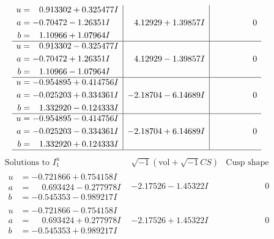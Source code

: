 \documentclass[1p]{elsarticle_modified}
\theoremstyle{definition}
\newcommand{\I}{\sqrt{-1}}
\begin{document}
$$\begin{array}{c|c|c}
\begin{aligned}
u &= \phantom{-}0.913302 + 0.325477 I \\
a &= -0.70472 - 1.26351 I \\
b &= \phantom{-}1.10966 + 1.07964 I\end{aligned}
 & \phantom{-}4.12929 + 1.39857 I & \phantom{-0.000000 } 0 \\ \hline\begin{aligned}
u &= \phantom{-}0.913302 - 0.325477 I \\
a &= -0.70472 + 1.26351 I \\
b &= \phantom{-}1.10966 - 1.07964 I\end{aligned}
 & \phantom{-}4.12929 - 1.39857 I & \phantom{-0.000000 } 0 \\ \hline\begin{aligned}
u &= -0.954895 + 0.414756 I \\
a &= -0.025203 + 0.334361 I \\
b &= \phantom{-}1.332920 - 0.124333 I\end{aligned}
 & -2.18704 - 6.14689 I & \phantom{-0.000000 } 0 \\ \hline\begin{aligned}
u &= -0.954895 - 0.414756 I \\
a &= -0.025203 - 0.334361 I \\
b &= \phantom{-}1.332920 + 0.124333 I\end{aligned}
 & -2.18704 + 6.14689 I & \phantom{-0.000000 } 0\\
 \hline 
 \end{array}$$\newpage$$\begin{array}{c|c|c}  
\text{Solutions to }I^u_{1}& \I (\text{vol} + \sqrt{-1}CS) & \text{Cusp shape}\\
 \hline 
\begin{aligned}
u &= -0.721866 + 0.754158 I \\
a &= \phantom{-}0.693424 - 0.277978 I \\
b &= -0.545353 - 0.989217 I\end{aligned}
 & -2.17526 - 1.45322 I & \phantom{-0.000000 } 0 \\ \hline\begin{aligned}
u &= -0.721866 - 0.754158 I \\
a &= \phantom{-}0.693424 + 0.277978 I \\
b &= -0.545353 + 0.989217 I\end{aligned}
 & -2.17526 + 1.45322 I & \phantom{-0.000000 } 0 \\ \hline\begin{aligned}

\end{aligned}
\end{array}$$
\end{document}
